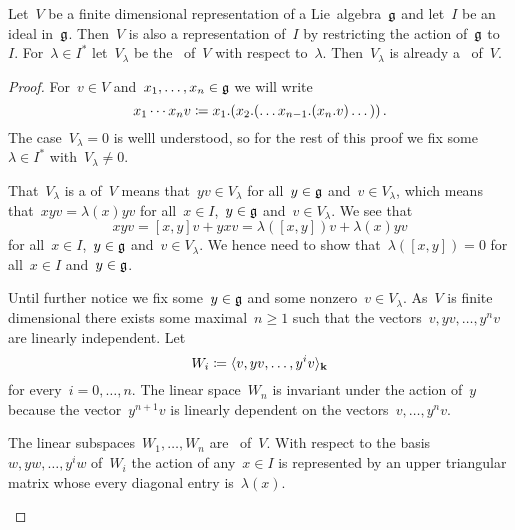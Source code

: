 \begin{lemma}
  Let~$V$ be a finite dimensional representation of a Lie~algebra~$\glie$ and let~$I$ be an ideal in~$\glie$.
  Then~$V$ is also a representation of~$I$ by restricting the action of~$\glie$ to~$I$.
  For~$\lambda \in I^*$ let~$V_\lambda$ be the~{} of~$V$ with respect to~$\lambda$.
  Then~$V_\lambda$ is already a~{\subrepresentation{$\glie$}} of~$V$.
\end{lemma}


\begin{proof}
  For~$v \in V$ and~$x_1, \dotsc, x_n \in \mathfrak{g}$ we will write
  \[
    x_1 \dotsm x_n v
    \coloneqq
    x_1.(x_2.( \dotsc x_{n-1}.(x_n.v) \dotsc )) \,.
  \]
  The case~$V_\lambda = 0$ is welll understood, so for the rest of this proof we fix some~$\lambda \in I^*$ with~$V_\lambda \neq 0$.
 
  That~$V_\lambda$ is a {\subrepresentation{$\glie$}} of~$V$ means that~$yv \in V_\lambda$ for all~$y \in \mathfrak{g}$ and~$v \in V_\lambda$, which  means that~$xyv = \lambda(x)yv$ for all~$x \in I$,~$y \in \mathfrak{g}$ and~$v \in V_\lambda$.
  We see that
  \[
    xyv
    =
    [x,y]v + yxv
    =
    \lambda([x,y])v + \lambda(x)yv
  \]
  for all~$x \in I$,~$y \in \mathfrak{g}$ and~$v \in V_\lambda$.
  We hence need to show that~$\lambda([x,y]) = 0$ for all~$x \in I$ and~$y \in \mathfrak{g}$.
 
  Until further notice we fix some~$y \in \mathfrak{g}$ and some nonzero~$v \in V_\lambda$.
  As~$V$ is finite dimensional there exists some maximal~$n \geq 1$ such that the vectors~$v, yv, \dotsc, y^n v$ are linearly independent.
  Let
  \[
    W_i
    \coloneqq
    \langle v, yv, \dotsc, y^i v\rangle_{\mathbf{k}}
  \]
  for every~$i = 0, \dotsc, n$.
  The linear space~$W_n$ is invariant under the action of~$y$ because the vector~$y^{n+1} v$ is linearly dependent on the vectors~$v, \dotsc, y^n v$.
 
  \begin{claim*}
    The linear subspaces~$W_1, \dotsc, W_n$ are~{} of~$V$.
    With respect to the basis~$w, y w, \dotsc, y^i w$ of~$W_i$ the action of any~$x \in I$ is represented by an upper triangular matrix whose every diagonal entry is~$\lambda(x)$.
  \end{claim*}


\end{proof}
